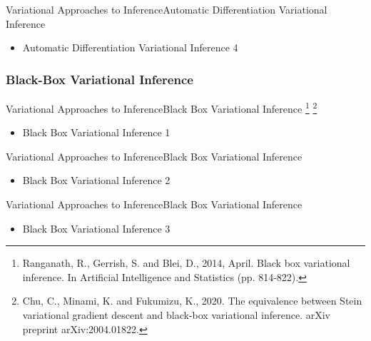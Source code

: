 \documentclass[AERbeamer%
              ,optEnglish%
              ,optBiber%
              ,optBibstyleAlphabetic%
              ,optBeamerClassicFormat%
              ]{AERlatex}%
\begin{document}
\begin{frame}[c]{Variational Approaches to Inference}{Automatic Differentiation Variational Inference}
    \centering
    \begin{itemize}
        \item Automatic Differentiation Variational Inference 4
    \end{itemize}
\end{frame}



\subsubsection*{Black-Box Variational Inference}
\begin{frame}[c]{Variational Approaches to Inference}{Black Box Variational Inference \footnote{Ranganath, R., Gerrish, S. and Blei, D., 2014, April. Black box
                                                                                                variational inference. In Artificial Intelligence and Statistics (pp. 814-822).}
                                                                                      \footnote{Chu, C., Minami, K. and Fukumizu, K., 2020. The equivalence between Stein
                                                                                                variational gradient descent and black-box variational inference. arXiv preprint arXiv:2004.01822.}}
    \centering
    \begin{itemize}
        \item Black Box Variational Inference 1
    \end{itemize}
\end{frame}


\begin{frame}[c]{Variational Approaches to Inference}{Black Box Variational Inference}
    \centering
    \begin{itemize}
        \item Black Box Variational Inference 2
    \end{itemize}
\end{frame}


\begin{frame}[c]{Variational Approaches to Inference}{Black Box Variational Inference}
    \centering
    \begin{itemize}
        \item Black Box Variational Inference 3
    \end{itemize}
\end{frame}
\end{document}
